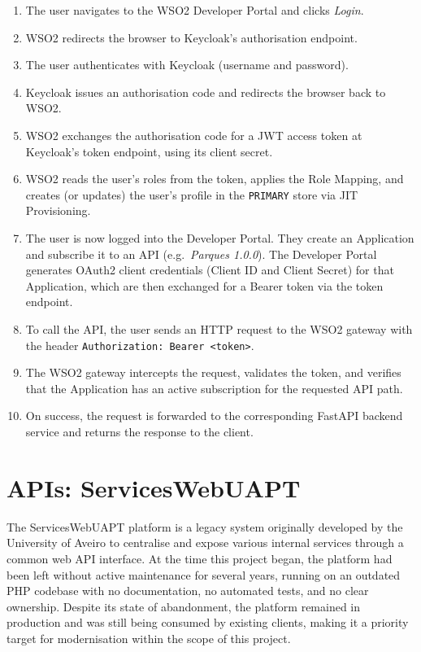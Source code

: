 \documentclass[12pt, a4paper]{report}
\begin{document}
\begin{enumerate}
    \item The user navigates to the WSO2 Developer Portal and clicks \textit{Login}.
    \item WSO2 redirects the browser to Keycloak's authorisation endpoint.
    \item The user authenticates with Keycloak (username and password).
    \item Keycloak issues an authorisation code and redirects the browser back to WSO2.
    \item WSO2 exchanges the authorisation code for a JWT access token at Keycloak's
          token endpoint, using its client secret.
    \item WSO2 reads the user's roles from the token, applies the Role Mapping, and
          creates (or updates) the user's profile in the \texttt{PRIMARY} store via JIT
          Provisioning.
    \item The user is now logged into the Developer Portal. They create an Application
          and subscribe it to an API (e.g.\ \textit{Parques 1.0.0}). The Developer
          Portal generates OAuth2 client credentials (Client ID and Client Secret) for
          that Application, which are then exchanged for a Bearer token via the token
          endpoint.
    \item To call the API, the user sends an HTTP request to the WSO2 gateway
          with the header \texttt{Authorization: Bearer <token>}.
    \item The WSO2 gateway intercepts the request, validates the token, and verifies
          that the Application has an active subscription for the requested API path.
    \item On success, the request is forwarded to the corresponding
          FastAPI backend service and returns the response to the client.
\end{enumerate}


\section{APIs: ServicesWebUAPT}
The ServicesWebUAPT platform is a legacy system originally developed by the University of
Aveiro to centralise and expose various internal services through a common web API interface.
At the time this project began, the platform had been left without active maintenance for
several years, running on an outdated PHP codebase with no documentation, no automated tests,
and no clear ownership. Despite its state of abandonment, the platform remained in production
and was still being consumed by existing clients, making it a priority target for modernisation
within the scope of this project.
\end{document}
